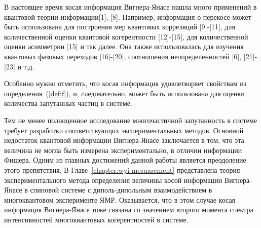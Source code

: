 В настоящее время косая информация Вигнера-Янасе нашла много применений в квантовой теории информации[1], [8]. 
Например, информация о перекосе может быть использована для построения мер квантовых корреляций [9]-[11], 
для количественной оценки квантовой когерентности [12]-[15], 
для количественной оценки асимметрии [15] и так далее.
Она также использовалась для изучения квантовых фазовых переходов [16]-[20], соотношения неопределенностей [6], [21]-[23] и т.д.

Особенно нужно отметить, 
что косая информация удовлетворяет свойствам из определения~(\ref{def:f}), 
и, cледовательно, может быть использована для оценки количества запутанных частиц в системе. 



Тем не менее полноценное исследование многочастичной запутанность в системе
требует разработки соответствующих экспериментальных методов. 
Основной недостаток квантовой информации Вигнера-Янасе заключается в том, 
что эта величина не могла быть измерена экспериментально, 
в отличии информации Фишера\cite{Garttner2018}. 
Одним из главных достижений данной работы является преодоление этого препятствия. 
В Главе~\ref{chapter:wyi-mesuarement} представлена теория экспериментального метода определения величины косой информации Вигнера-Янасе 
в спиновой системе с диполь-дипольным взаимодействием в многоквантовом эксперименте ЯМР. 
Оказывается,
что в этом случае косая информация Вигнера-Янасе тоже связана со значением 
второго момента спектра интенсивностей многоквантовых когерентностей в системе.

